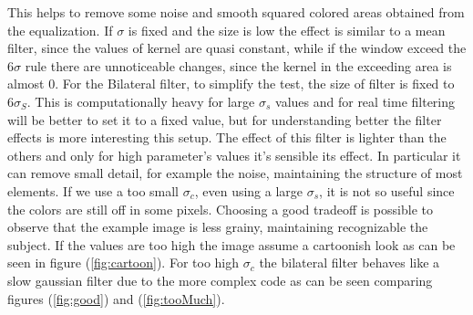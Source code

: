 \documentclass[11pt,a4paper]{article}
\begin{document}
This helps to remove some noise and smooth squared colored areas obtained from the equalization.
If $\sigma$ is fixed and the size is low the effect is similar to a mean filter, since the values of kernel are quasi constant, while if the window exceed the 6$\sigma$ rule there are unnoticeable changes, since the kernel in the exceeding area is almost 0.\newline
For the Bilateral filter, to simplify the test, the size of filter is fixed to $6\sigma_{S}$. This is computationally heavy for large $\sigma_s$ values and for real time filtering will be better to set it to a fixed value, but for understanding better the filter effects is more interesting this setup.
The effect of this filter is lighter than the others and only for high parameter's values it's sensible its effect.
In particular it can remove small detail, for example the noise, maintaining the structure of most elements.
If we use a too small $\sigma_c$, even using a large $\sigma_s$, it is not so useful since the colors are still off in some pixels.
Choosing a good tradeoff is possible to observe that the example image is less grainy, maintaining recognizable the subject.
If the values are too high the image assume a cartoonish look as can be seen in figure (\ref{fig:cartoon}). For too high $\sigma_c$ the bilateral filter behaves like a slow gaussian filter due to the more complex code as can be seen comparing figures (\ref{fig:good}) and (\ref{fig:tooMuch}).
\end{document}
